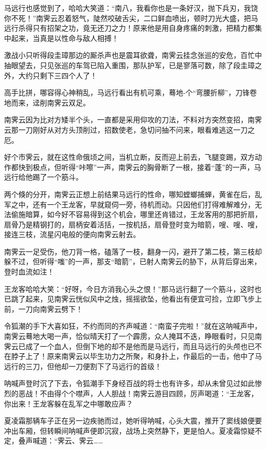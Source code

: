 \documentclass[12pt,oneside]{book}
\begin{document}
马远行也感觉到了，哈哈大笑道：``南八，我看你也是一条好汉，抛下兵刃，我饶你不死！''南霁云忍着怒气，陡然咬破舌尖，二口鲜血喷出，顿时刀光大盛，把马远行杀得只有招架之功，竟无还刀之力！原来他是用自身疼痛的刺激，把精力都集中起来，当真是以性命与敌人相搏！

激战小只听得段圭璋那边的厮杀声也是震耳欲聋，南霁云挂念张巡的安危，百忙中抽眼望去，只见张巡的车驾已陷入重围，那队护军，已是寥落可数，除了段圭璋之外，大约只剩下三四个人了！

高手比拼，哪容得心神稍乱，马远行看出有机可乘，蓦地-个``弯腰折柳''，刀锋卷地而来，迳削南霁云双足。

南霁云因为比对方矮半个头，一直都是采用仰攻的刀法，不料对方突然变招，南霁云那一刀刚好从对方头顶削过，招数使老，急切问抽不问来，眼看难逃这一刀之厄。

好个市霁云，就在这性命俄顷之间，当机立断，反而迎上前去，飞腿变踢，双方动作都快到极点，但听得``咔嚓''一声，南霁云的胸骨断了一根，接着``蓬''的一声，马远行给他踢了一个筋斗。

两个倏的分开，南霁云正想上前结果马远行的性命，哪知螳螂捕蝉，黄雀在后，乱军之中，还有一个王龙客，早就窥伺一旁，待机而动。只因他们打得难解难分，无法偷施暗算，如今好不容易得到这个机会，哪里还肯错过，王龙客用的那把折扇，扇骨乃是精钢打的，扇柄安着活括，一按机括，扇骨登时变为暗箭，嗖、嗖、嗖，接连三枝，流星闪电般的便向南霁云射去。

南霁云一足受伤，他刀背一格，磕落了一枝，翻身一闪，避开了第二枝，第三枝却躲不过，但听得``嗤''的一声，那支``暗箭''，已射人南霁云的胁下，从背后穿出来，登时血流如注！

王龙客哈哈大笑：``好呀，今日方消我心头之恨！''那马远行翻了一个筋斗，这时也已跳了起来，见南霁云恍似风中之烛，摇摇欲坠，他看出有便宜可捡，立即飞步上前，一刀向南霁云劈下！

令狐潮的手下大喜如狂，不约而同的齐声喊道：``南蛮子完啦！''就在这呐喊声中，南霁云蓦地大喝一声，恰似晴天打了一个霹雳，众人掩耳不迭，睁眼看时，只见南霁云已成了一个血人，但倒下地的却不是他而是马远行，而且马远行的头颅也已不在脖子上了！原来南霁云以毕生功力之所聚，和身扑上，作最后的一击，他中了马远行的三刀，但他却一刀便割下了马远行的首级！

呐喊声登时沉了下去，令狐潮手下身经百战的将士也有许多，却从未曾见过如此惨烈的恶战！不由得个个噤声，人人胆战！南霁云游目四顾，厉声喝道：``王龙客，你出来！王龙客躲在乱军之中哪敢应声？

夏凌霜那辆车子正在另一边疾驰而过，她听得呐喊，心头大震，推开了窦线娘便要冲出车厢，但转瞬间呐喊声便即沉寂，战场上突然静下，更是怕人。夏凌霜惊疑不定，叠声喊道：``霁云、霁云\ldots\ldots{}
\end{document}
